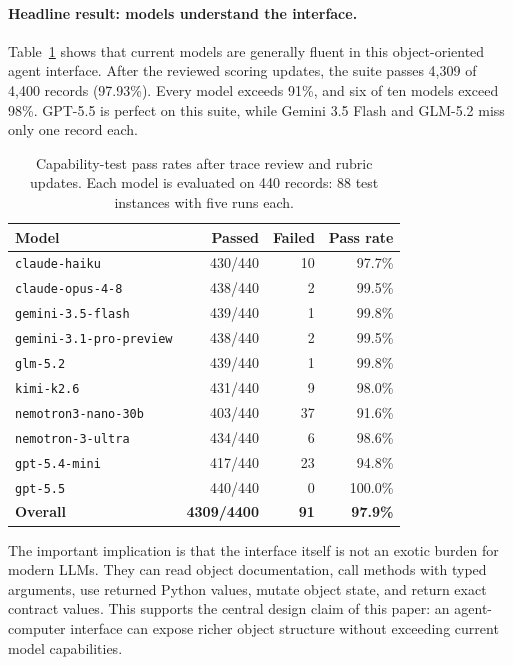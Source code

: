 \documentclass[11pt, logo, onecolumn, copyright, colorlinks=true, allcolors=blue]{nvidiatechreport}
\begin{document}
\paragraph{Headline result: models understand the interface.}
Table~\ref{tab:captests-model-summary} shows that current models are generally
fluent in this object-oriented agent interface. After the reviewed scoring
updates, the suite passes 4,309 of 4,400 records (97.93\%). Every model exceeds
91\%, and six of ten models exceed 98\%. GPT-5.5 is perfect on this suite, while
Gemini 3.5 Flash and GLM-5.2 miss only one record each.

\begin{table}[t]
\centering
\caption{Capability-test pass rates after trace review and rubric updates. Each
model is evaluated on 440 records: 88 test instances with five runs each.}
\label{tab:captests-model-summary}
\small
\begin{tabular}{lrrr}
\toprule
\textbf{Model} & \textbf{Passed} & \textbf{Failed} & \textbf{Pass rate} \\
\midrule
\texttt{claude-haiku} & 430/440 & 10 & 97.7\% \\
\texttt{claude-opus-4-8} & 438/440 & 2 & 99.5\% \\
\texttt{gemini-3.5-flash} & 439/440 & 1 & 99.8\% \\
\texttt{gemini-3.1-pro-preview} & 438/440 & 2 & 99.5\% \\
\texttt{glm-5.2} & 439/440 & 1 & 99.8\% \\
\texttt{kimi-k2.6} & 431/440 & 9 & 98.0\% \\
\texttt{nemotron3-nano-30b} & 403/440 & 37 & 91.6\% \\
\texttt{nemotron-3-ultra} & 434/440 & 6 & 98.6\% \\
\texttt{gpt-5.4-mini} & 417/440 & 23 & 94.8\% \\
\texttt{gpt-5.5} & 440/440 & 0 & 100.0\% \\
\midrule
\textbf{Overall} & \textbf{4309/4400} & \textbf{91} & \textbf{97.9\%} \\
\bottomrule
\end{tabular}
\end{table}

The important implication is that the interface itself is not an exotic burden
for modern LLMs. They can read object documentation, call methods with typed
arguments, use returned Python values, mutate object state, and return exact
contract values. This supports the central design claim of this paper: an
agent-computer interface can expose richer object structure without exceeding
current model capabilities.
\end{document}
